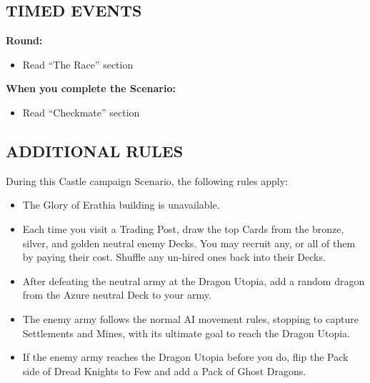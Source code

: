 \begin{multicols}{2}

\subsection*{\MakeUppercase{Timed Events}}

\textbf{ Round:}
\begin{itemize}
  \item Read ``The Race'' section
\end{itemize}

\textbf{When you complete the Scenario:}
\begin{itemize}
  \item Read ``Checkmate'' section
\end{itemize}

\subsection*{\MakeUppercase{Additional rules}}

During this Castle campaign Scenario, the following rules apply:

\begin{itemize}
  \item The Glory of Erathia building is unavailable.
  \item Each time you visit a Trading Post, draw the top Cards from the  bronze,  silver, and  golden neutral enemy Decks.
  You may recruit any, or all of them by paying their cost.
  Shuffle any un-hired ones back into their Decks.

  \item After defeating the neutral army at the Dragon Utopia, add a random dragon from the  Azure neutral Deck to your army.
  \item The enemy army follows the normal AI movement rules, stopping to capture Settlements and Mines, with its ultimate goal to reach the Dragon Utopia.
  \item If the enemy army reaches the Dragon Utopia before you do, flip the Pack side of Dread Knights to Few and add a Pack of Ghost Dragons.
\end{itemize}

\end{multicols}


